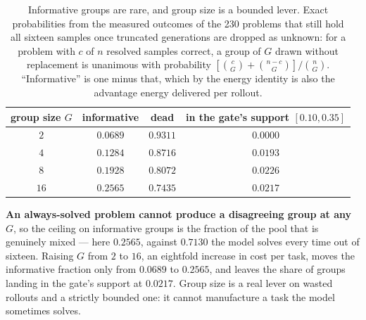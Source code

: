 \begin{table}[t]
\centering\small
\caption{Informative groups are rare, and group size is a bounded lever. Exact probabilities
from the measured outcomes of the 230 problems that still hold all sixteen samples once
truncated generations are dropped as unknown: for a problem with $c$ of $n$ resolved samples
correct, a group of $G$ drawn without replacement is unanimous with probability
$[\binom{c}{G}+\binom{n-c}{G}]/\binom{n}{G}$. ``Informative'' is one minus that, which by the
energy identity is also the advantage energy delivered per rollout.}
\label{tab:scarcity}
\begin{tabular}{cccc}
\toprule
group size $G$ & informative & dead & in the gate's support $[0.10,0.35]$ \\
\midrule
$2$ & $0.0689$ & $0.9311$ & $0.0000$ \\
$4$ & $0.1284$ & $0.8716$ & $0.0193$ \\
$8$ & $0.1928$ & $0.8072$ & $0.0226$ \\
$16$ & $0.2565$ & $0.7435$ & $0.0217$ \\
\bottomrule
\end{tabular}
\end{table}

\textbf{An always-solved problem cannot produce a disagreeing group at any $G$}, so the
ceiling on informative groups is the fraction of the pool that is genuinely mixed --- here
$0.2565$, against $0.7130$ the model solves every time out of sixteen. Raising $G$ from
$2$ to $16$, an eightfold increase in cost per task, moves the informative fraction only from
$0.0689$ to $0.2565$, and leaves the share of groups landing in the gate's support at $0.0217$.
Group size is a real lever on wasted rollouts and a strictly bounded one: it cannot manufacture
a task the model sometimes solves.

